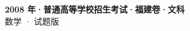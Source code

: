 \documentclass[zihao=-4, a4paper]{ctexart}
\begin{document}
\begin{center}
  {\Large\bfseries 2008 年·普通高等学校招生考试·福建卷·文科}\\[4pt]
  {\large 数学 · 试题版}
\end{center}
\medskip
{}

\end{document}
